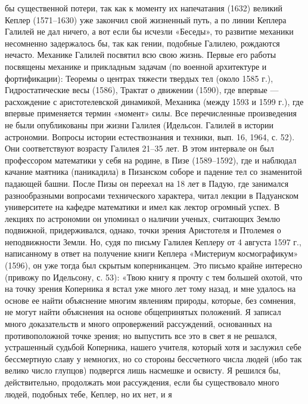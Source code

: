 бы  существенной  потери, так  как  к  моменту их  напечатания  (1632)
великий  Кеплер  (1571--1630)  уже  закончил свой  жизненный  путь,  а
по  линии  Кеплера Галилей  не  дал  ничего,  а  вот если  бы  исчезли
«Беседы»,  то   развитие  механики  несомненно  задержалось   бы,  так
как  гении,  подобные  Галилею, рождаются  нечасто.  Механике  Галилей
посвятил  всю  свою жизнь.  Первые  его  работы посвящены  механике  и
прикладным задачам (по военной  архитектуре и фортификации): Теоремы о
центрах  тяжести твердых  тел (около  1585 г.),  Гидростатические весы
(1586),  Трактат  о  движении  (1590),  где  впервые  ---  расхождение
с  аристотелевской  динамикой,  Механика   (между  1593  и  1599  г.),
где  впервые  применяется  термин  «момент»  силы.  Все  перечисленные
произведения не были опубликованы при жизни Галилея (Идельсон. Галилей
в истории  астрономии. Вопросы истории естествознания  и техники, вып.
16, 1964,  с. 52).  Они соответствуют возрасту  Галилея 21--35  лет. В
этом интервале он был профессором математики  у себя на родине, в Пизе
(1589--1592), где и наблюдал качание маятника (паникадила) в Пизанском
соборе  и падение  тел со  знаменитой  падающей башни.  После Пизы  он
переехал на  18 лет  в Падую,  где занимался  разнообразными вопросами
технического  характера, читал  лекции  в  Падуанском университете  на
кафедре  математики  и  имел  как лектор  огромный  успех.  В  лекциях
по  астрономии   он  упоминал   о  наличии  ученых,   считающих  Землю
подвижной, придерживался, однако, точки зрения Аристотеля и Птолемея о
неподвижности Земли. Но,  судя по письму Галилея Кеплеру  от 4 августа
1597 г.,  написанному в  ответ на  получение книги  Кеплера «Мистериум
космографикум»  (1596), он  уже тогда  был скрытым  коперниканцем. Это
письмо крайне  интересно (привожу  по Идельсону,  с. 53):  «Твою книгу
я  прочту  с  тем  большей  охотой,  что  на  точку  зрения  Коперника
я  встал  уже  много лет  тому  назад,  и  мне  удалось на  основе  ее
найти объяснение  многим явлениям  природы, которые, без  сомнения, не
могут  найти объяснения  на основе  общепринятых положений.  Я записал
много доказательств  и много  опровержений рассуждений,  основанных на
противоположной  точке  зрения; но  выпустить  все  это  в свет  я  не
решался, устрашенный судьбой Коперника, нашего учителя, который хотя и
заслужил себе бессмертную славу у  немногих, но со стороны бессчетного
числа людей (ибо  так велико число глупцов) подвергся  лишь насмешке и
освисту. Я решился бы, действительно, продолжать мои рассуждения, если
бы существовало  много людей, подобных  тебе, Кеплер,  но их нет,  и я
